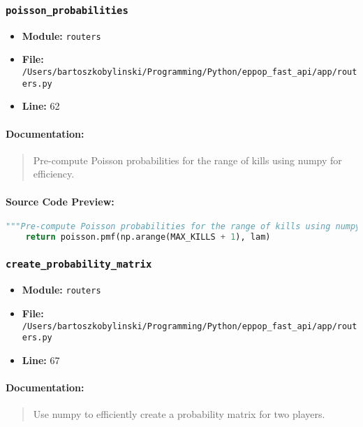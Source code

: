 \documentclass[11pt,a4paper]{article}
\begin{document}
\vspace{1em}
\subsubsection{\texttt{poisson\_probabilities}}

\begin{itemize}
    \item \textbf{Module:} \texttt{routers}
    \item \textbf{File:} \texttt{/Users/bartoszkobylinski/Programming/Python/eppop\_fast\_api/app/routers.py}
    \item \textbf{Line:} 62
\end{itemize}

\paragraph{Documentation:}
\begin{quote}
Pre-compute Poisson probabilities for the range of kills using numpy for efficiency.
\end{quote}

\paragraph{Source Code Preview:}
\begin{lstlisting}[language=Python]
    """Pre-compute Poisson probabilities for the range of kills using numpy for efficiency."""
    return poisson.pmf(np.arange(MAX_KILLS + 1), lam)
\end{lstlisting}

\vspace{1em}
\subsubsection{\texttt{create\_probability\_matrix}}

\begin{itemize}
    \item \textbf{Module:} \texttt{routers}
    \item \textbf{File:} \texttt{/Users/bartoszkobylinski/Programming/Python/eppop\_fast\_api/app/routers.py}
    \item \textbf{Line:} 67
\end{itemize}

\paragraph{Documentation:}
\begin{quote}
Use numpy to efficiently create a probability matrix for two players.
\end{quote}
\end{document}
